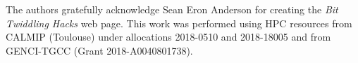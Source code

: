 \documentclass[aip,jcp,reprint,showkeys]{revtex4-1}
\begin{document}

\begin{acknowledgments}
The authors gratefully acknowledge Sean Eron Anderson for creating the 
\emph{Bit Twiddling Hacks} web page.
This work was performed using HPC resources from CALMIP (Toulouse) under
allocations 2018-0510 and 2018-18005 and from GENCI-TGCC (Grant
2018-A0040801738).
\end{acknowledgments}



\end{document}
